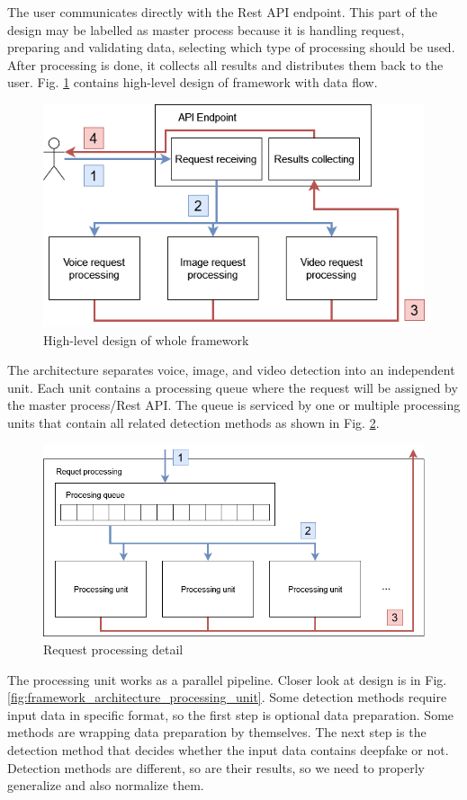 The user communicates directly with the Rest API endpoint. This part of the design may be labelled as master process because it is handling request, preparing and validating data, selecting which type of processing should be used. After processing is done, it collects all results and distributes them back to the user. Fig. \ref{fig:framework_architecture} contains high-level design of framework with data flow.

\begin{figure}[H]
    \centering
    \includegraphics[width=.7\linewidth]{other-fig/framework_architecture.png}        
    \caption{High-level design of whole framework}
    \label{fig:framework_architecture}
\end{figure}

The architecture separates voice, image, and video detection into an independent unit. Each unit contains a processing queue where the request will be assigned by the master process/Rest API. The queue is serviced by one or multiple processing units that contain all related detection methods as shown in Fig. \ref{fig:framework_architecture_request_processing}.

\begin{figure}[H]
    \centering
    \includegraphics[width=.65\linewidth]{other-fig/framework_architecture_request_processing.png}        
    \caption{Request processing detail}
\label{fig:framework_architecture_request_processing}
\end{figure}

The processing unit works as a parallel pipeline. Closer look at design is in Fig. \ref{fig:framework_architecture_processing_unit}. Some detection methods require input data in specific format, so the first step is optional data preparation. Some methods are wrapping data preparation by themselves. The next step is the detection method that decides whether the input data contains deepfake or not. Detection methods are different, so are their results, so we need to properly generalize and also normalize them.

